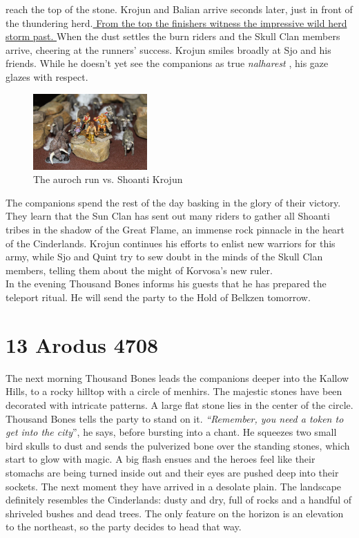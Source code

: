 reach the top of the stone. Krojun and Balian arrive seconds later, just in front of the thundering herd.\hyperref[fig:The-auroch-run-vs-Shoanti-Krojun-586163164]{ From the top the finishers witness the impressive wild herd storm past. } When the dust settles the burn riders and the Skull Clan members arrive, cheering at the runners' success. Krojun smiles broadly at Sjo and his friends. While he doesn't yet see the companions as true  {\itshape nalharest} , his gaze glazes with respect. \\

\begin{figure}[h]
	\centering
	\includegraphics[width=0.39\textwidth]{images/The-auroch-run-vs-Shoanti-Krojun-586163164.jpg}
	\caption{The auroch run vs. Shoanti Krojun}
	\label{fig:The-auroch-run-vs-Shoanti-Krojun-586163164}
\end{figure}

The companions spend the rest of the day basking in the glory of their victory. They learn that the Sun Clan has sent out many riders to gather all Shoanti tribes in the shadow of the Great Flame, an immense rock pinnacle in the heart of the Cinderlands. Krojun continues his efforts to enlist new warriors for this army, while Sjo and Quint try to sew doubt in the minds of the Skull Clan members, telling them about the might of Korvosa's new ruler.\\

In the evening Thousand Bones informs his guests that he has prepared the teleport ritual. He will send the party to the Hold of Belkzen tomorrow.\\

\section{13 Arodus 4708}

The next morning Thousand Bones leads the companions deeper into the Kallow Hills, to a rocky hilltop with a circle of menhirs. The majestic stones have been decorated with intricate patterns. A large flat stone lies in the center of the circle. Thousand Bones tells the party to stand on it. {\itshape``Remember, you need a token to get into the city}'', he says, before bursting into a chant. He squeezes two small bird skulls to dust and sends the pulverized bone over the standing stones, which start to glow with magic. A big flash ensues and the heroes feel like their stomachs are being turned inside out and their eyes are pushed deep into their sockets. The next moment they have arrived in a desolate plain. The landscape definitely resembles the Cinderlands: dusty and dry, full of rocks and a handful of shriveled bushes and dead trees. The only feature on the horizon is an elevation to the northeast, so the party decides to head that way.\\

